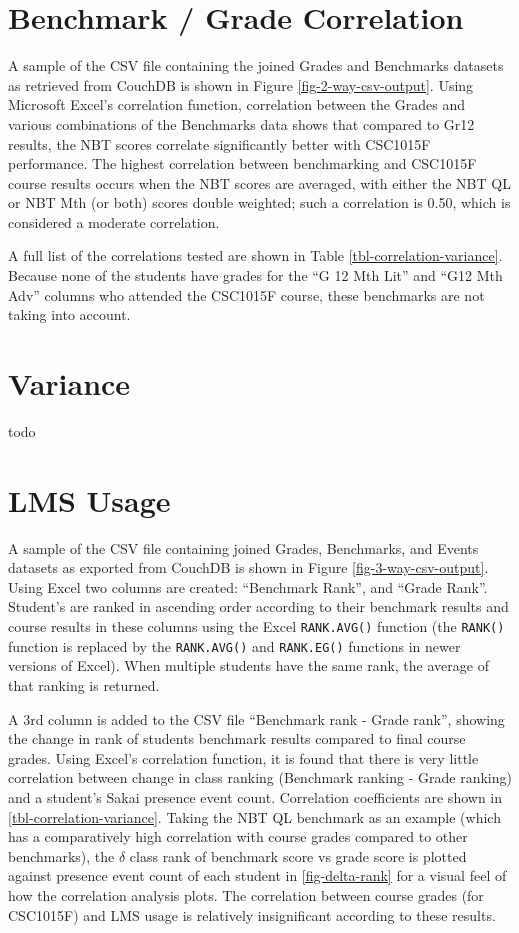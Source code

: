 \section{Benchmark / Grade Correlation}
A sample of the CSV file containing the joined Grades and Benchmarks datasets as retrieved from CouchDB is shown in Figure \ref{fig-2-way-csv-output}. Using Microsoft Excel's correlation function, correlation between the Grades and various combinations of the Benchmarks data shows that compared to Gr12 results, the NBT scores correlate significantly better with CSC1015F performance. The highest correlation between benchmarking and CSC1015F course results occurs when the NBT scores are averaged, with either the NBT QL or NBT Mth (or both) scores double weighted; such a correlation is 0.50, which is considered a moderate correlation.

A full list of the correlations tested are shown in Table \ref{tbl-correlation-variance}. Because none of the students have grades for the ``G 12 Mth Lit'' and ``G12 Mth Adv'' columns who attended the CSC1015F course, these benchmarks are not taking into account.

\section{Variance}
todo

\section{LMS Usage}
A sample of the CSV file containing joined Grades, Benchmarks, and Events datasets as exported from CouchDB is shown in Figure \ref{fig-3-way-csv-output}. Using Excel two columns are created: ``Benchmark Rank'', and ``Grade Rank''. Student's are ranked in ascending order according to their benchmark results and course results in these columns using the Excel \texttt{RANK.AVG()} function (the \texttt{RANK()} function is replaced by the \texttt{RANK.AVG()} and \texttt{RANK.EG()} functions in newer versions of Excel). When multiple students have the same rank, the average of that ranking is returned.

A 3rd column is added to the CSV file ``Benchmark rank - Grade rank'', showing the change in rank of students benchmark results compared to final course grades. Using Excel's correlation function, it is found that there is very little correlation between change in class ranking (Benchmark ranking - Grade ranking) and a student's Sakai presence event count. Correlation coefficients are shown in \ref{tbl-correlation-variance}. Taking the NBT QL benchmark as an example (which has a comparatively high correlation with course grades compared to other benchmarks), the \( \delta \) class rank of benchmark score vs grade score is plotted against presence event count of each student in \ref{fig-delta-rank} for a visual feel of how the correlation analysis plots. The correlation between course grades (for CSC1015F) and LMS usage is relatively insignificant according to these results.